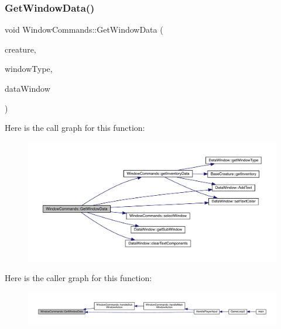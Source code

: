 \subsubsection{\texorpdfstring{Get\+Window\+Data()}{GetWindowData()}}
{\footnotesize\ttfamily void Window\+Commands\+::\+Get\+Window\+Data (\begin{DoxyParamCaption}\item[{\mbox{\hyperlink{class_base_creature}{Base\+Creature}} \&}]{creature,  }\item[{\mbox{\hyperlink{_data_window_8hpp_a3c1e0c6fe947fdbea7502497b27cf44d}{En\+Data\+Window\+Type}}}]{window\+Type,  }\item[{\mbox{\hyperlink{class_data_window}{Data\+Window}} \&}]{data\+Window }\end{DoxyParamCaption})}

Here is the call graph for this function\+:
\nopagebreak
\begin{figure}[H]
\begin{center}
\leavevmode
\includegraphics[width=350pt]{class_window_commands_ab301c0f80a6c632ce5a858e6307feebd_cgraph}
\end{center}
\end{figure}
Here is the caller graph for this function\+:
\nopagebreak
\begin{figure}[H]
\begin{center}
\leavevmode
\includegraphics[width=350pt]{class_window_commands_ab301c0f80a6c632ce5a858e6307feebd_icgraph}
\end{center}
\end{figure}
\mbox{\label{class_window_commands_ac4a64479853dfa15653a7690403815b7}} 
